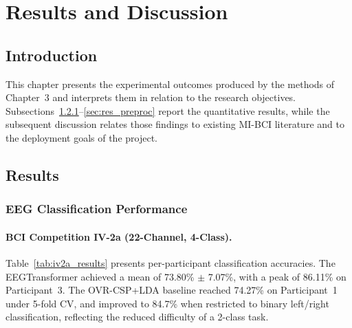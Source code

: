 \documentclass[12pt, a4paper]{article}
\begin{document}
\section{Results and Discussion}

\subsection{Introduction}

This chapter presents the experimental outcomes produced by the methods of Chapter~3 and interprets them in relation to the research objectives. Subsections~\ref{sec:res_class}--\ref{sec:res_preproc} report the quantitative results, while the subsequent discussion relates those findings to existing MI-BCI literature and to the deployment goals of the project.

\subsection{Results}

\subsubsection{EEG Classification Performance}
\label{sec:res_class}

\paragraph{BCI Competition IV-2a (22-Channel, 4-Class).}

Table~\ref{tab:iv2a_results} presents per-participant classification accuracies. The EEGTransformer achieved a mean of 73.80\% $\pm$ 7.07\%, with a peak of 86.11\% on Participant~3. The OVR-CSP+LDA baseline reached 74.27\% on Participant~1 under 5-fold CV, and improved to 84.7\% when restricted to binary left/right classification, reflecting the reduced difficulty of a 2-class task.
\end{document}
